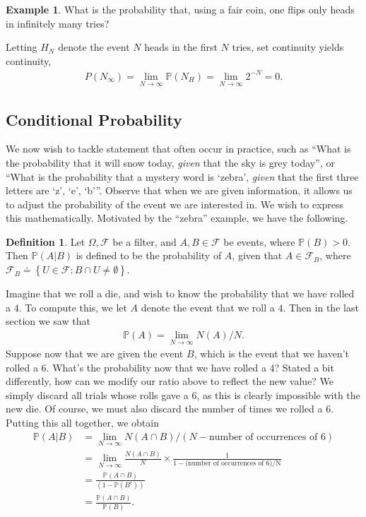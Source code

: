 \documentclass[12pt]{article}
\newcommand{\filter}{\mathcal{F}}
\newcommand{\prob}{\mathbb{P}}
\theoremstyle{plain}
\theoremstyle{definition}
\newtheorem*{definition}{Definition}
\newtheorem*{example}{Example}
\theoremstyle{remark}
\numberwithin{equation}{section}  %
\begin{document}
\begin{example}What is the probability that, using a fair coin, one
flips only heads in infinitely many tries? 
\end{example}
Letting $H_N$ denote the event
$N$ heads in the first $N$ tries, set continuity yields
continuity,
\begin{align*}
P(N_\infty) = \lim_{N \to \infty} \prob(N_H) = \lim_{N \to \infty} 2^{-N} = 0.
\end{align*}
\subsection{Conditional Probability}
We now wish to tackle statement that often occur in practice,
such as ``What is the probability that it will snow today, \emph{given}
that the sky is grey today'', or ``What is the probability that a mystery word
is `zebra', \emph{given} that the first three letters are `z', `e', `b'''.
Observe that when we are given information, it allows us to adjust the
probability of the event we are interested in. We wish to express this
mathematically. Motivated by the ``zebra'' example, we have the following.
\begin{definition}
Let $\Omega, \filter$ be a filter, and $A, B \in \filter$ be events, where
$\prob(B) > 0$. Then $\prob(A | B)$ is defined to be the probability of $A$, given that $A \in \filter_B$, where $\filter_B
\doteq \left\{ U \in \filter: B \cap U \neq \emptyset \right\}$.
\end{definition}
Imagine that we roll a die, and wish to know the probability that
we have rolled a $4$.
To compute this, we let $A$ denote the event that we roll a $4$. Then in the last section we saw
that
\begin{align*}
\prob(A) = \lim_{N \to \infty} N(A)/N.
\end{align*}
Suppose now that we are given the event $B$, which is the event that we haven't
rolled a $6$.
What's the probability now that we have rolled a $4$?
Stated a bit differently, how can we modify our ratio above to reflect the
new value? We simply discard all trials whose rolls gave a $6$, as this is clearly
impossible with the new die. Of course, we must also discard the number of times
we rolled a $6$. Putting this all together, we obtain
\begin{align*}
\prob(A | B) & = \lim_{N \to \infty} N(A \cap B)/(N -
\text{number of occurrences of $6$})
\\
& = \lim_{N \to \infty} \frac{N(A \cap B)}{N} \times \frac{1}{1 - (\text{number
of occurrences of $6$)/N}}
\\
& = \frac{\prob(A \cap B)}{(1 - \prob(B^c))}
\\
& = \frac{\prob(A \cap B)}{\prob(B)}.
\end{align*}
\end{document}
